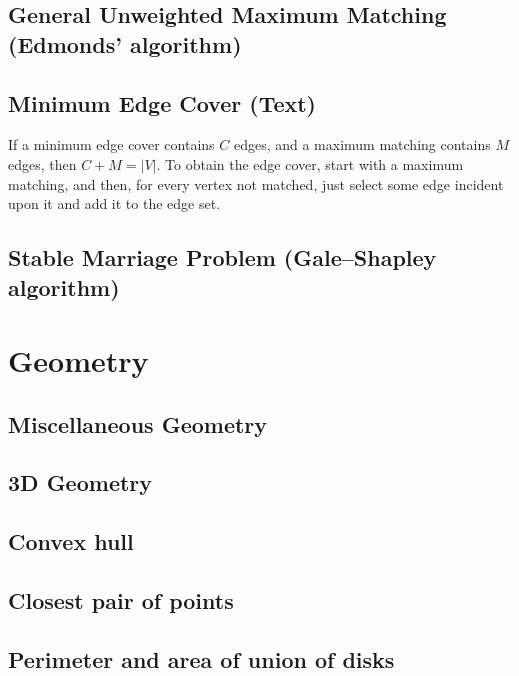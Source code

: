 \documentclass[9pt]{extarticle}
\begin{document}
\begin{multicols}{3}
\subsection{General Unweighted Maximum Matching (Edmonds' algorithm)}


\subsection{Minimum Edge Cover (Text)}
If a minimum edge cover contains $C$ edges, and a maximum matching contains $M$ edges, then $C + M = |V|$. To obtain the edge cover, start with a maximum matching, and then, for every vertex not matched, just select some edge incident upon it and add it to the edge set. 

\subsection{Stable Marriage Problem (Gale--Shapley algorithm)}


\section{Geometry}

\subsection{Miscellaneous Geometry}


\subsection{3D Geometry}


\subsection{Convex hull}


\subsection{Closest pair of points}


\subsection{Perimeter and area of union of disks}



\end{multicols}
\end{document}
